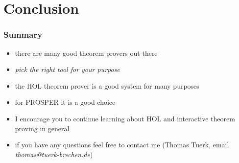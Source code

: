 \section{Conclusion}

\begin{frame}
\frametitle{Summary}

\begin{itemize}
\item there are many good theorem provers out there
\item \emph{pick the right tool for your purpose}
\item the HOL theorem prover is a good system for many purposes
\item for PROSPER it is a good choice
\item I encourage you to continue learning about HOL and interactive theorem proving in general
\item if you have any questions feel free to contact me (Thomas Tuerk, email \emph{thomas@tuerk-brechen.de})
\end{itemize}

\end{frame}


